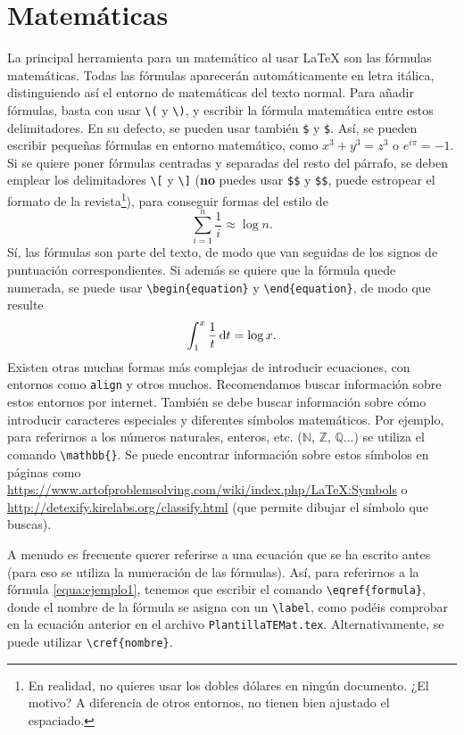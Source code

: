 \documentclass[%
extracommands,%
]{revistaanem}
\begin{document}
\section{Matemáticas}

La principal herramienta para un matemático al usar \LaTeX{} son las fórmulas matemáticas.
Todas las fórmulas aparecerán automáticamente en letra itálica, distinguiendo así el entorno de matemáticas del texto normal.
Para añadir fórmulas, basta con usar \verb+\(+ y \verb+\)+, y escribir la fórmula matemática entre estos delimitadores.
En su defecto, se pueden usar también \verb+$+ y \verb+$+.
Así, se pueden escribir pequeñas fórmulas en entorno matemático, como \(x^3+y^3=z^3\) o $e^{i\pi}=-1$.
Si se quiere poner fórmulas centradas y separadas del resto del párrafo, se deben emplear los delimitadores \verb+\[+ y \verb+\]+ (\textbf{no} puedes usar \verb+$$+ y \verb+$$+, puede estropear el formato de la revista\footnote{En realidad, no quieres usar los dobles dólares en ningún documento. ¿El motivo? A diferencia de otros entornos, no tienen bien ajustado el espaciado.}), para conseguir formas del estilo de
\[\sum_{i=1}^n\frac{1}{i}\approx\log n.\]
Sí, las fórmulas son parte del texto, de modo que van seguidas de los signos de puntuación correspondientes.
Si además se quiere que la fórmula quede numerada, se puede usar \verb+\begin{equation}+ y \verb+\end{equation}+, de modo que resulte
\begin{equation}\label{equa:ejemplo1}
\int_{1}^x\frac{1}{t} \mathop{}\!\mathrm{d} t = \log x.
\end{equation}
Existen otras muchas formas más complejas de introducir ecuaciones, con entornos como \verb+align+ y otros muchos.
Recomendamos buscar información sobre estos entornos por internet.
También se debe buscar información sobre cómo introducir caracteres especiales y diferentes símbolos matemáticos.
Por ejemplo, para referirnos a los números naturales, enteros, etc. ($\mathbb{N}$, $\mathbb{Z}$, $\mathbb{Q}$...) se utiliza el comando \verb+\mathbb{}+.
Se puede encontrar información sobre estos símbolos en páginas como \url{https://www.artofproblemsolving.com/wiki/index.php/LaTeX:Symbols} o \url{http://detexify.kirelabs.org/classify.html} (que permite dibujar el símbolo que buscas).

A menudo es frecuente querer referirse a una ecuación que se ha escrito antes (para eso se utiliza la numeración de las fórmulas).
Así, para referirnos a la fórmula \eqref{equa:ejemplo1}, tenemos que escribir el comando \verb+\eqref{formula}+, donde el nombre de la fórmula se asigna con un \verb+\label+, como podéis comprobar en la ecuación anterior en el archivo \verb+PlantillaTEMat.tex+.
Alternativamente, se puede utilizar \verb+\cref{nombre}+.
\end{document}
